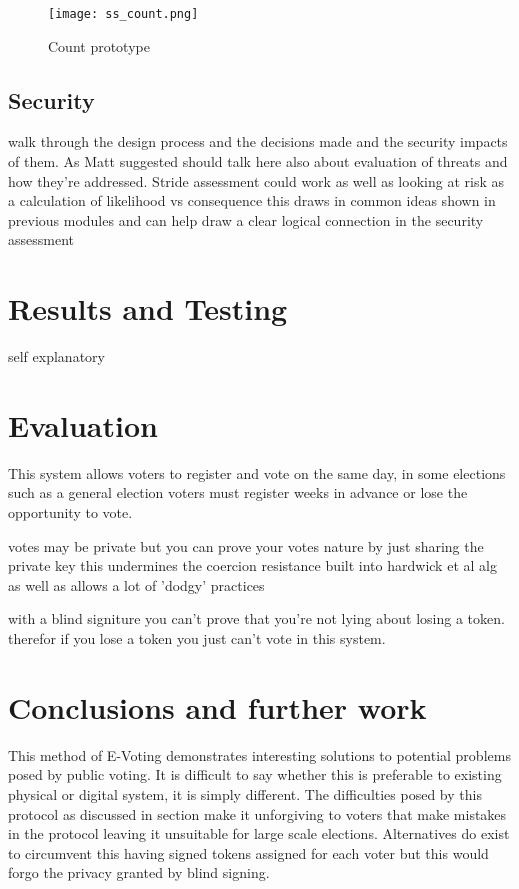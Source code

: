\documentclass{entcs}
\begin{document}
\begin{figure}[h!]
    \centering
    \texttt{[image: ss\_count.png]}
    \caption{Count prototype}
    \label{fig:count}
\end{figure}

\subsection{Security}
walk through the design process and the decisions made and the security impacts of them.
As Matt suggested should talk here also about evaluation of threats and how they're addressed. 
Stride assessment could work as well as looking at risk as a calculation of likelihood vs consequence this draws in common ideas shown in previous modules and can help draw a clear logical connection in the security assessment

\section{Results and Testing}
self explanatory 


\section{Evaluation}\label{sec: Eval}
This system allows voters to register and vote on the same day, in some elections such as a general election voters must register weeks in advance or lose the opportunity to vote.

votes may be private but you can prove your votes nature by just sharing the private key this undermines the coercion resistance built into hardwick et al alg as well as allows a lot of 'dodgy' practices

with a blind signiture you can't prove that you're not lying about losing a token. therefor if you lose a token you just can't vote in this system.

\section{Conclusions and further work}
This method of E-Voting demonstrates interesting solutions to potential problems posed by public voting. It is difficult to say whether this is preferable to existing physical or digital system, it is simply different. The difficulties posed by this protocol as discussed in section \label{sec:eval} make it unforgiving to voters that make mistakes in the protocol leaving it unsuitable for large scale elections. Alternatives do exist to circumvent this having signed tokens assigned for each voter but this would forgo the privacy granted by blind signing. 
\end{document}
